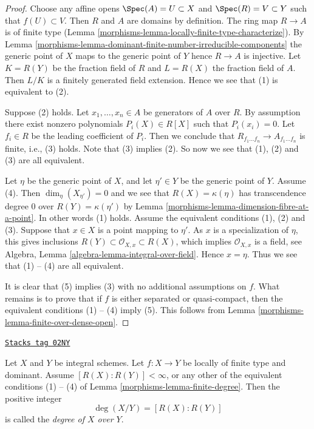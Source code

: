\begin{proof}

Choose any affine opens $\Spec(A) = U \subset X$
and $\Spec(R) = V \subset Y$ such that $f(U) \subset V$.
Then $R$ and $A$ are domains by definition. The ring map
$R \to A$ is of finite type
(Lemma \ref{morphisms-lemma-locally-finite-type-characterize}).
By Lemma \ref{morphisms-lemma-dominant-finite-number-irreducible-components}
the generic point of $X$ maps to the generic point of $Y$
hence $R \to A$ is injective. Let $K = R(Y)$ be the fraction field
of $R$ and $L = R(X)$ the fraction field of $A$. Then $L/K$
is a finitely generated field extension. Hence we see that
(1) is equivalent to (2).

\medskip\noindent
Suppose (2) holds. Let $x_1, \ldots, x_n \in A$ be generators
of $A$ over $R$. By assumption there exist nonzero polynomials
$P_i(X) \in R[X]$ such that $P_i(x_i) = 0$. Let $f_i \in R$ be the
leading coefficient of $P_i$. Then we conclude that
$R_{f_1 \ldots f_n} \to A_{f_1 \ldots f_n}$ is finite, i.e., (3) holds.
Note that (3) implies (2). So now we see that (1), (2) and (3) are all
equivalent.

\medskip\noindent
Let $\eta$ be the generic point of $X$, and let $\eta' \in Y$ be the
generic point of $Y$. Assume (4). Then
$\dim_\eta(X_{\eta'}) = 0$ and we see that $R(X) = \kappa(\eta)$ has
transcendence degree $0$ over $R(Y) = \kappa(\eta')$ by
Lemma \ref{morphisms-lemma-dimension-fibre-at-a-point}.
In other words (1) holds. Assume the equivalent conditions (1), (2) and
(3). Suppose that $x \in X$ is a point mapping to $\eta'$.
As $x$ is a specialization of $\eta$,
this gives inclusions $R(Y) \subset \mathcal{O}_{X, x} \subset R(X)$,
which implies $\mathcal{O}_{X, x}$ is a field, see
Algebra, Lemma \ref{algebra-lemma-integral-over-field}.
Hence $x = \eta$. Thus we see that (1) -- (4)
are all equivalent.

\medskip\noindent
It is clear that (5) implies (3) with no additional assumptions on
$f$. What remains is to prove that if $f$ is either separated or
quasi-compact, then the equivalent conditions (1) -- (4) imply (5).
This follows from Lemma \ref{morphisms-lemma-finite-over-dense-open}.
\end{proof}

\begin{definition}[Degree]
\label{morphisms-definition-degree}
\href{https://stacks.math.columbia.edu/tag/02NY}{\texttt{Stacks tag 02NY}}

Let $X$ and $Y$ be integral schemes.
Let $f : X \to Y$ be locally of finite type and dominant.
Assume $[R(X) : R(Y)] < \infty$, or any other of the equivalent
conditions (1) -- (4) of Lemma \ref{morphisms-lemma-finite-degree}.
Then the positive integer
$$
\deg(X/Y) = [R(X) : R(Y)]
$$
is called the {\it degree of $X$ over $Y$}.
\end{definition}

